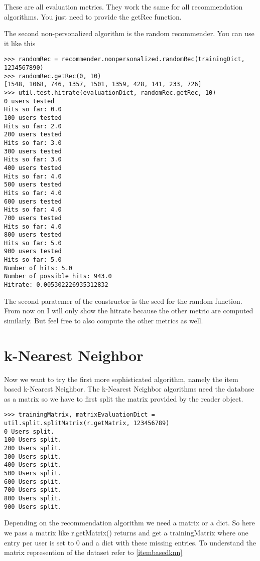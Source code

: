 These are all evaluation metrics. They work the same for all 
recommendation algorithms. You just need to provide the getRec function.

The second non-personalized algorithm is the random recommender.
You can use it like this
\begin{lstlisting}
>>> randomRec = recommender.nonpersonalized.randomRec(trainingDict, 1234567890)
>>> randomRec.getRec(0, 10)
[1548, 1068, 746, 1357, 1501, 1359, 428, 141, 233, 726]
>>> util.test.hitrate(evaluationDict, randomRec.getRec, 10)
0 users tested
Hits so far: 0.0
100 users tested
Hits so far: 2.0
200 users tested
Hits so far: 3.0
300 users tested
Hits so far: 3.0
400 users tested
Hits so far: 4.0
500 users tested
Hits so far: 4.0
600 users tested
Hits so far: 4.0
700 users tested
Hits so far: 4.0
800 users tested
Hits so far: 5.0
900 users tested
Hits so far: 5.0
Number of hits: 5.0
Number of possible hits: 943.0
Hitrate: 0.005302226935312832
\end{lstlisting}
The second paratemer of the constructor is the seed for the random function.
From now on I will only show the hitrate because the other metric are computed
similarly. But feel free to also compute the other metrics as well.

\section{k-Nearest Neighbor}
Now we want to try the first more sophisticated algorithm, namely the item based
k-Nearest Neighbor. The k-Nearest Neighbor algorithms need the database as a matrix so we have to
first split the matrix provided by the reader object.
\begin{lstlisting}
>>> trainingMatrix, matrixEvaluationDict = util.split.splitMatrix(r.getMatrix, 123456789)
0 Users split.
100 Users split.
200 Users split.
300 Users split.
400 Users split.
500 Users split.
600 Users split.
700 Users split.
800 Users split.
900 Users split.
\end{lstlisting}
Depending on the recommendation algorithm we need a matrix or a dict.
So here we pass a matrix like r.getMatrix() returns and get a trainingMatrix where one
entry per user is set to 0 and a dict with these missing entries.
To understand the matrix represention of the dataset refer to \ref{itembasedknn}

